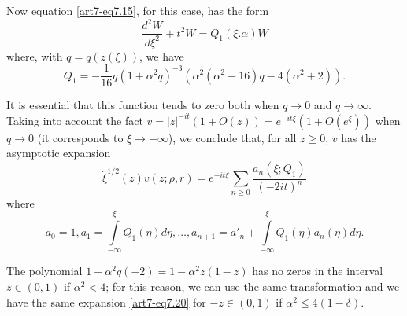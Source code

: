 Now equation \eqref{art7-eq7.15}, for this case, has the form 
\begin{equation}
\frac{d^2 W}{d\xi^2} + t^2 W = Q_1 (\xi. \alpha) W \label{art7-eq7.18}
\end{equation}
where, with $q =q (z (\xi))$, we have
\begin{equation}
Q_1 = - \frac{1}{16} q (1+ \alpha^2q)^{-3} (\alpha^2 (\alpha^2 -16)q-4 (\alpha^2 + 2)). \label{art7-eq7.19}
\end{equation}

It is essential that this function tends to zero both when $q \to 0$ and $q \to \infty$. Taking into account the fact $v = |z|^{-\textit{it}} (1+ O(z)) = e^{-\textit{it} \xi} (1+ O(e^\xi))$ when $q \to 0$ (it corresponds to $\xi \to - \infty$), we conclude that, for all $z \geqslant 0$, $v$ has the asymptotic expansion
\begin{equation}
\dot{\xi}^{1/2} (z) v (z; \rho, r) = e^{-\textit{it} \xi}  \sum\limits_{n \geqslant 0} \frac{a_n (\xi; Q_1)}{(-2 it)^n}
\label{art7-eq7.20}
\end{equation}
where\pageoriginale
\begin{equation}
a_0 = 1, a_1 = \int\limits^\xi_{-\infty} Q_1 (\eta) d \eta, \ldots, a_{n+1} = a'_n + \int\limits^\xi_{-\infty} Q_1 (\eta) a_n (\eta) d \eta. 
\label{art7-eq7.21}
\end{equation}

The polynomial $1+ \alpha^2 q (-2) =  1- \alpha^2 z(1-z)$ has no zeros in the interval $z \in (0, 1)$ if $\alpha^2 < 4$; for this reason, we can use the same transformation and we have the same expansion \eqref{art7-eq7.20} for $-z \in (0,1)$ if $\alpha^2 \leqslant 4 (1-\delta)$.

\setcounter{section}{2}
